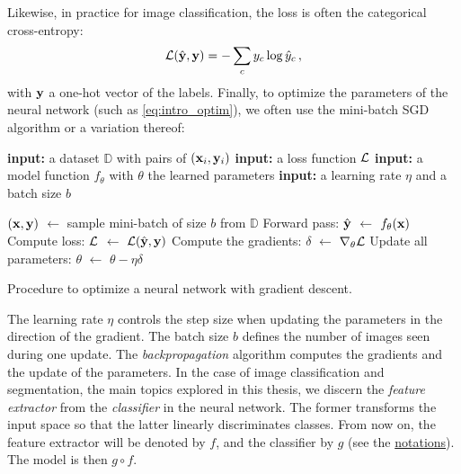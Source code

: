 Likewise, in practice for image classification, the loss is often the categorical cross-entropy:
%
\begin{equation}
      \mathcal{L}(\hat{\mathbf{y}}, \mathbf{y}) = -\sum_c y_c \log \hat{y}_c\,,
      \label{eq:intro_ce}
\end{equation}
%
\noindent with $\mathbf{y}$ a one-hot vector of the labels. Finally, to optimize the parameters of the neural
network (such as \autoref{eq:intro_optim}), we often use the mini-batch \ac{SGD} algorithm or a variation thereof:

\begin{algorithm}
      \begin{algorithmic}[1]
            \Statex \textbf{input:} a dataset $\mathbb{D}$ with pairs of $(\mathbf{x}_i, \mathbf{y}_i)$
            \Statex \textbf{input:} a loss function $\mathcal{L}$
            \Statex \textbf{input:} a model function $f_\theta$ with $\theta$ the learned parameters
            \Statex \textbf{input:} a learning rate $\eta$ and a batch size $b$
            \Statex

            \State $(\mathbf{x}, \mathbf{y})$ $\gets$ sample mini-batch of size $b$ from $\mathbb{D}$
            \State Forward pass: $\hat{\mathbf{y}}$ $\gets$ $f_\theta(\mathbf{x})$
            \State Compute loss: $\mathcal{L}$ $\gets$ $\mathcal{L}(\hat{\mathbf{y}}, \mathbf{y})$
            \State Compute the gradients: $\delta$ $\gets$ $\nabla_\theta \mathcal{L}$
            \State Update all parameters: $\theta$ $\gets$ $\theta - \eta \delta$
            \EndWhile
      \end{algorithmic}
      \caption{Procedure to optimize a neural network with gradient descent.}
      \label{algo:intro_sgd}
\end{algorithm}

The learning rate $\eta$ controls the step size when updating the parameters in the direction of the
gradient. The batch size $b$ defines the number of images seen during one update. The
\textit{backpropagation} algorithm \citep{rumelhart1986backprop} computes the gradients and the
update of the parameters. In the case of image classification and segmentation, the main topics
explored in this thesis, we discern the \textit{feature extractor} from the \textit{classifier} in
the neural network. The former transforms the input space so that the latter linearly discriminates
classes. From now on, the feature extractor will be denoted by $f$, and the classifier by $g$ (see
the \hyperref[chap:notations]{notations}). The model is then $g \circ f$.

